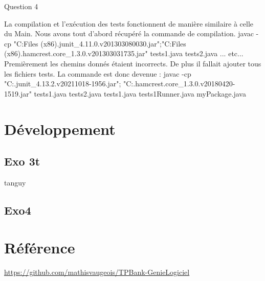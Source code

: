 \documentclass{article}
\begin{document}
\newline
Question 4
\newline

La compilation et l'exécution des tests fonctionnent de manière similaire à celle du Main.
Nous avons tout d'abord récupéré la commande de compilation.
javac -cp "C:\Program Files (x86)\eclipse\plugins\org.junit_4.11.0.v201303080030\junit.jar";"C:\Program Files (x86)\eclipse\plugins\org.hamcrest.core_1.3.0.v201303031735.jar" tests\MyTest1.java tests\MyTest2.java ... etc...
Premièrement les chemins donnés étaient incorrects. De plus il fallait ajouter tous les fichiers tests.
La commande est donc devenue :
javac -cp "C:\eclipse\plugins\org.junit_4.13.2.v20211018-1956.jar"; "C:\eclipse\plugins\org.hamcrest.core_1.3.0.v20180420-1519.jar" 
tests\MyTest1.java tests\MyTest2.java tests\MyTestSuite1.java tests\MyTestSuite1Runner.java myPackage\DossierBancaire.java

\newpage
\section{Développement}
\subsection{Exo 3t}
tanguy
\subsection{Exo4}
\newpage
\section*{Référence}
\url{https://github.com/mathisvaugeois/TPBank-GenieLogiciel}
\end{document}
